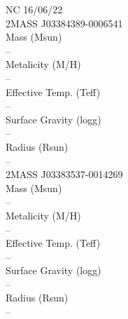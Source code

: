 NC 16/06/22\\
2MASS J03384389-0006541\\


Mass (Msun)\\
--\\
Metalicity (M/H)\\
--\\
Effective Temp. (Teff)\\
--\\
Surface Gravity (logg)\\
--\\
Radius (Rsun)\\
--\\


2MASS J03383537-0014269\\
Mass (Msun)\\
--\\
Metalicity (M/H)\\
--\\
Effective Temp. (Teff)\\
--\\
Surface Gravity (logg)\\
--\\
Radius (Rsun)\\
--\\